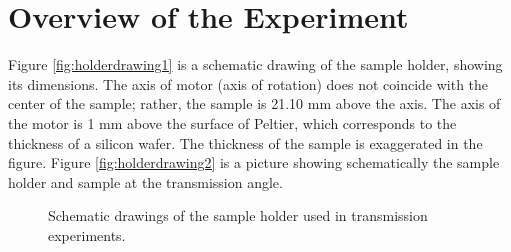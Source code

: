 \documentclass[letterpaper,12pt]{article}
\begin{document}
\section{Overview of the Experiment}
Figure \ref{fig:holderdrawing1} is a schematic drawing of the sample holder, showing its dimensions. The axis of motor (axis of rotation) does not coincide with the center of the sample; rather, the sample is 21.10 mm above the axis. The axis of the motor is 1 mm above the surface of Peltier, which corresponds to the thickness of a silicon wafer. The thickness of the sample is exaggerated in the figure. Figure \ref{fig:holderdrawing2} is a picture showing schematically the sample holder and sample at the transmission angle. 
\begin{figure}[htbp]
	\centering
	\qquad
	\caption{Schematic drawings of the sample holder used in transmission experiments.}
\end{figure}
\end{document}
